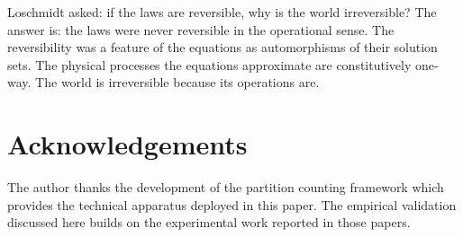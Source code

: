 \documentclass[twocolumn,10pt,a4paper]{article}
\theoremstyle{definition}
\theoremstyle{remark}
\begin{document}
Loschmidt asked: if the laws are reversible, why is the world irreversible? The answer is: the laws were never reversible in the operational sense. The reversibility was a feature of the equations as automorphisms of their solution sets. The physical processes the equations approximate are constitutively one-way. The world is irreversible because its operations are.

\section*{Acknowledgements}

The author thanks the development of the partition counting framework \citep{sachikonye2025loschmidt,sachikonye2025partition,sachikonye2025counting,sachikonye2025temporal} which provides the technical apparatus deployed in this paper. The empirical validation discussed here builds on the experimental work reported in those papers.



\end{document}
